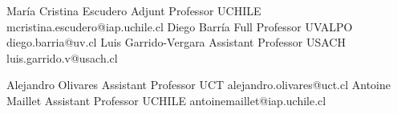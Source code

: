 





\begin{referees}
		{María Cristina Escudero}
		{Adjunt Professor}
		{UCHILE}
		{mcristina.escudero@iap.uchile.cl}
		{Diego Barría}
		{Full Professor}
		{UVALPO}
		{diego.barria@uv.cl}
		{Luis Garrido-Vergara}
		{Assistant Professor}
		{USACH}
		{luis.garrido.v@usach.cl}
\end{referees}

\begin{referees}
		{Alejandro Olivares}
		{Assistant Professor}
		{UCT}
		{alejandro.olivares@uct.cl}
		{Antoine Maillet}
		{Assistant Professor}
		{UCHILE}
		{antoinemaillet@iap.uchile.cl}
\end{referees}

